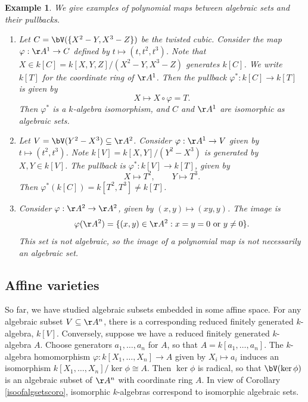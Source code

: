 \documentclass[12pt]{amsart}
\theoremstyle{plain}
\newtheorem{example}[theorem]{Example}
\begin{document}
\begin{example}We give examples of polynomial maps between algebraic sets and their pullbacks.
\begin{enumerate}
\item 
Let $C = \bV(\{X^2-Y, X^3-Z\})$ be the twisted cubic.
Consider the map $\varphi : \AA^1 \to C$ defined by $t \mapsto (t, t^2, t^3)$.
Note that $X \in k[C] = k[X, Y, Z]/(X^2-Y, X^3-Z)$ generates $k[C]$.
We write $k[T]$ for the coordinate ring of $\AA^1$.
Then the pullback $\varphi^* : k[C] \to k[T]$ is given by
$$X \mapsto X \circ \varphi = T.$$
Then $\varphi^*$ is a $k$-algebra isomorphism, and $C$ and $\AA^1$ are isomorphic as algebraic sets.

\item
Let $V = \bV(Y^2-X^3)\subseteq\AA^2$.
Consider $\varphi:\AA^1 \to V$ given by $t \mapsto (t^2, t^3)$.
Note $k[V] = k[X, Y]/(Y^2 - X^3)$ is generated by $X, Y \in k[V]$.
The pullback is $\varphi^*:k[V] \to k[T]$, given by
$$X \mapsto T^2, \qquad Y \mapsto T^3.$$
Then $\varphi^*(k[C]) = k[T^2, T^3] \ne k[T]$.

\item
Consider $\varphi:\AA^2 \to \AA^2$, given by $(x, y) \mapsto (xy, y)$.
The image is
$$\varphi(\AA^2) = \{(x,y) \in \AA^2 : x=y=0 \text{ or } y \ne 0\}.$$
This set is not algebraic, so the image of a polynomial map is not necessarily an algebraic set.
\end{enumerate}
\end{example}

\subsection{Affine varieties}\label{varietiessection}
So far, we have studied algebraic subsets embedded in some affine space.
For any algebraic subset $V\subseteq\AA^n$, there is a corresponding reduced finitely generated $k$-algebra, $k[V]$.
Conversely, suppose we have a reduced finitely generated $k$-algebra $A$.
Choose generators $a_1, \ldots, a_n$ for $A$, so that $A = k[a_1, \ldots, a_n]$.
The $k$-algebra homomorphism $\varphi : k[X_1, \ldots, X_n] \to A$ given by $X_i \mapsto a_i$ induces an isomorphism $k[X_1, \ldots, X_n] / \ker \phi \cong A$.
Then $\ker\phi$ is radical, so that $\bV(\ker \phi)$ is an algebraic subset of $\AA^n$ with coordinate ring $A$.
In view of Corollary \ref{isoofalgsetscoro}, isomorphic $k$-algebras correspond to isomorphic algebraic sets.
\end{document}
